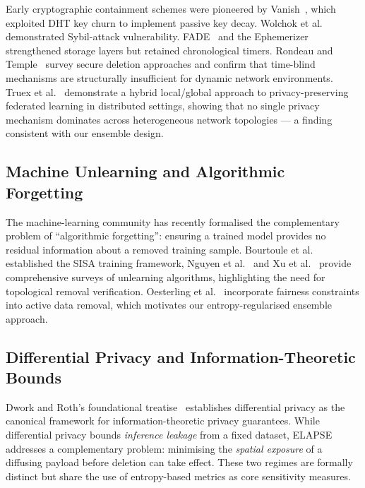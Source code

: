 \documentclass[review,12pt]{elsarticle}
\begin{document}
Early cryptographic containment schemes were pioneered by
Vanish~\cite{geambasu2009vanish}, which exploited DHT key churn to implement
passive key decay. Wolchok et al.~\cite{wolchok2010defeating} demonstrated
Sybil-attack vulnerability. FADE~\cite{tang2010fade} and the
Ephemerizer~\cite{perlman2005ephemerizer} strengthened storage layers but
retained chronological timers. Rondeau and Temple~\cite{rondeau2021secure}
survey secure deletion approaches and confirm that time-blind mechanisms are
structurally insufficient for dynamic network environments. Truex et al.~\cite{truex2019hybrid} demonstrate a hybrid local/global
approach to privacy-preserving federated learning in distributed settings,
showing that no single privacy mechanism dominates across heterogeneous
network topologies — a finding consistent with our ensemble design.

\subsection{Machine Unlearning and Algorithmic Forgetting}

The machine-learning community has recently formalised the complementary
problem of ``algorithmic forgetting'': ensuring a trained model provides no
residual information about a removed training sample. Bourtoule
et al.~\cite{bourtoule2021machine} established the SISA training framework,
Nguyen et al.~\cite{nguyen2025survey} and Xu et al.~\cite{xu2023machine}
provide comprehensive surveys of unlearning algorithms, highlighting the
need for topological removal verification. Oesterling
et al.~\cite{oesterling2024fair} incorporate fairness constraints into active
data removal, which motivates our entropy-regularised ensemble approach.

\subsection{Differential Privacy and Information-Theoretic Bounds}

Dwork and Roth's foundational treatise~\cite{dwork2014algorithmic} establishes
differential privacy as the canonical framework for information-theoretic
privacy guarantees. While differential privacy bounds \emph{inference
leakage} from a fixed dataset, ELAPSE addresses a complementary problem:
minimising the \emph{spatial exposure} of a diffusing payload before deletion
can take effect. These two regimes are formally distinct but share the use of
entropy-based metrics as core sensitivity measures.
\end{document}
